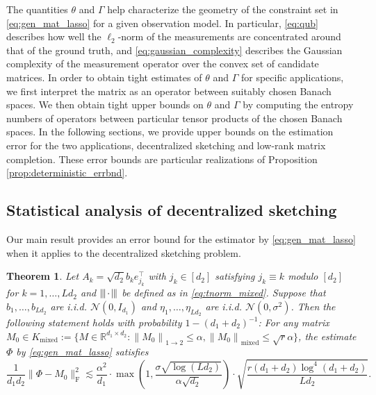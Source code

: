 \documentclass[11pt]{article}
\newtheorem{theorem}[lemma]{Theorem}
\newcommand{\xspace}{\hbox{\kern-2.5pt}}
\newcommand\tnorm[1]{\left\vert\xspace\left\vert\xspace\left\vert\mskip2mu
#1\mskip2mu \right\vert\xspace\right\vert\xspace\right\vert}
\newcommand{\norm}[1]{\left \|#1 \right \|}
\begin{document}
The quantities $\theta$ and $\Gamma$ help characterize the geometry of the constraint set in \eqref{eq:gen_mat_lasso} for a given observation model. In particular, \eqref{eq:qub} describes how well the $\ell_2$-norm of the measurements are concentrated around that of the ground truth, and \eqref{eq:gaussian_complexity} describes the Gaussian complexity of the measurement operator over the convex set of candidate matrices. In order to obtain tight estimates of $\theta$ and $\Gamma$ for specific applications, we first interpret the matrix as an operator between suitably chosen Banach spaces. We then obtain tight upper bounds on $\theta$ and $\Gamma$ by computing the entropy numbers of operators between particular tensor products of the chosen Banach spaces. In the following sections, we provide upper bounds on the estimation error for the two applications, decentralized sketching and low-rank matrix completion. These error bounds are particular realizations of Proposition \ref{prop:deterministic_errbnd}. 


\subsection{Statistical analysis of decentralized sketching}
\label{subsec:main}

Our main result provides an error bound for the estimator by \eqref{eq:gen_mat_lasso} when it applies to the decentralized sketching problem. 

\begin{theorem}
\label{thm:eb_ds}
Let $A_k = \sqrt{d_2} b_k e_{j_k}^\top$ with $j_k \in [d_2]$ satisfying $j_k \equiv k$ modulo $[d_2]$ for $k=1,\dots,Ld_2$ and $\tnorm{\cdot}$ be defined as in \eqref{eq:tnorm_mixed}. 
Suppose that $b_1,\dots,b_{Ld_2}$ are i.i.d. $\mathcal{N}(0,I_{d_1})$ and $\eta_1,\dots,\eta_{Ld_2}$ are i.i.d. $\mathcal{N}(0,\sigma^2)$. 
Then the following statement holds with probability $1 - (d_1+d_2)^{-1}$: 
For any matrix $M_0 \in K_\mathrm{mixed} := \{ M \in \mathbb{R}^{d_1 \times d_2} : \norm{M_0}_{1\to 2} \leq \alpha, \norm{M_0}_\mathrm{mixed} \leq \sqrt{r} \alpha\}$, the estimate $\Phi$ by \eqref{eq:gen_mat_lasso} satisfies 
\begin{equation}
\label{eq:ub1:ds}
\frac{1}{d_1 d_2} \|\Phi - M_0\|_\mathrm{F}^2 
\lesssim \frac{\alpha^2}{d_1} \cdot \max\left(1, \frac{\sigma\sqrt{\log(Ld_2)}}{\alpha\sqrt{d_2}}\right) \cdot \sqrt{\frac{r(d_1+d_2)\log^4(d_1+d_2)}{Ld_2}}. \end{equation}
\end{theorem}
\end{document}
